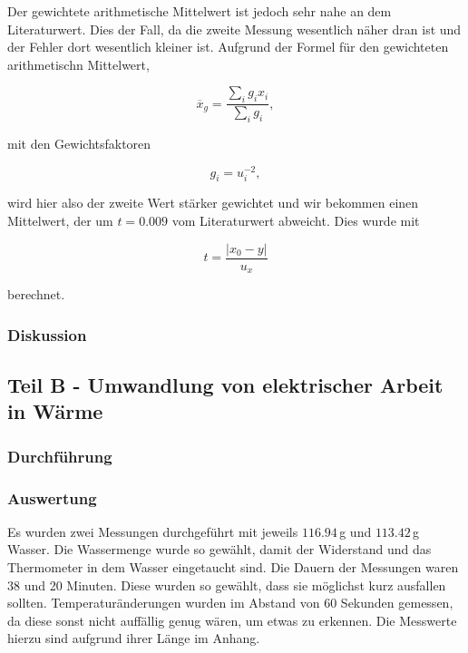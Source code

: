 \documentclass[11pt,a4paper]{article}
\begin{document}
Der gewichtete arithmetische Mittelwert ist jedoch sehr nahe an dem Literaturwert. Dies der Fall, da die zweite Messung wesentlich n\"aher dran ist und der Fehler dort wesentlich kleiner ist. Aufgrund der Formel f\"ur den gewichteten arithmetischn Mittelwert,

\begin{equation}
\overline{x}_g=\frac{\sum_ig_ix_i}{\sum_ig_i},
\end{equation}

mit den Gewichtsfaktoren

\begin{equation}
g_i=u_i^{-2},
\end{equation}

wird hier also der zweite Wert st\"arker gewichtet und wir bekommen einen Mittelwert, der um $t = 0.009$ vom Literaturwert abweicht. Dies wurde mit 

\begin{equation}
t=\frac{|x_0-y|}{u_x}\label{abw}
\end{equation}

berechnet.

\subsubsection{Diskussion}

\pagebreak

\subsection{Teil B - Umwandlung von elektrischer Arbeit in Wärme}

\subsubsection{Durchf\"uhrung}

\subsubsection{Auswertung}

Es wurden zwei Messungen durchgef\"uhrt mit jeweils $116.94\,$g und $113.42\,$g Wasser. Die Wassermenge wurde so gew\"ahlt, damit der Widerstand und das Thermometer in dem Wasser eingetaucht sind. Die Dauern der Messungen waren 38 und 20 Minuten. Diese wurden so gew\"ahlt, dass sie m\"oglichst kurz ausfallen sollten. Temperatur\"anderungen wurden im Abstand von 60 Sekunden gemessen, da diese sonst nicht auff\"allig genug w\"aren, um etwas zu erkennen. Die Messwerte hierzu sind aufgrund ihrer L\"ange im Anhang.
\end{document}
